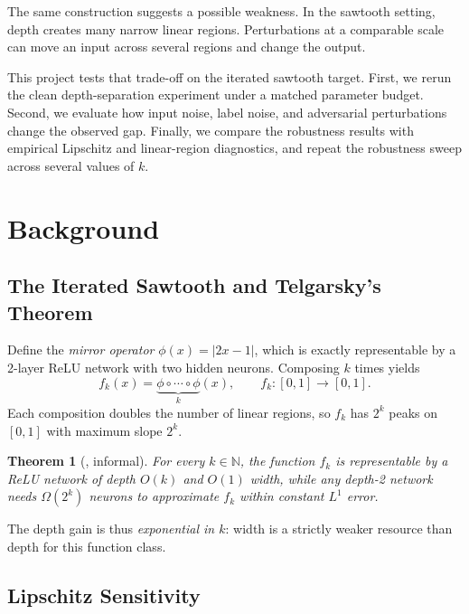 \documentclass[10pt,twocolumn]{article}
\newtheorem{theorem}{Theorem}
\begin{document}
The same construction suggests a possible weakness. In the sawtooth setting, depth
creates many narrow linear regions. Perturbations at a comparable scale can move an
input across several regions and change the output.

This project tests that trade-off on the iterated sawtooth target. First, we rerun
the clean depth-separation experiment under a matched parameter budget. Second, we
evaluate how input noise, label noise, and adversarial perturbations change the
observed gap. Finally, we compare the robustness results with empirical Lipschitz
and linear-region diagnostics, and repeat the robustness sweep across several values
of $k$.

\section{Background}
\label{sec:background}

\subsection{The Iterated Sawtooth and Telgarsky's Theorem}

Define the \emph{mirror operator} $\phi(x) = |2x - 1|$, which is exactly representable
by a 2-layer ReLU network with two hidden neurons. Composing $k$ times yields
\begin{equation}
  f_k(x) = \underbrace{\phi \circ \cdots \circ \phi}_{k}(x),
  \qquad f_k : [0,1] \to [0,1].
\end{equation}
Each composition doubles the number of linear regions, so $f_k$ has $2^k$ peaks on $[0,1]$
with maximum slope $2^k$.

\begin{theorem}[\citealt{telgarsky2016benefits}, informal]
  For every $k \in \mathbb{N}$, the function $f_k$ is representable by a ReLU network
  of depth $O(k)$ and $O(1)$ width, while any depth-2 network needs $\Omega(2^k)$ neurons
  to approximate $f_k$ within constant $L^1$ error.
\end{theorem}

The depth gain is thus \emph{exponential in $k$}: width is a strictly weaker resource
than depth for this function class.

\subsection{Lipschitz Sensitivity}
\end{document}
